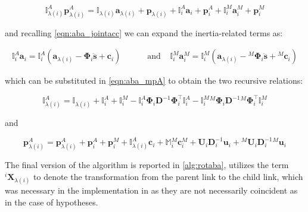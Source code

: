 \begin{equation}
    \label{eqn:aba_mpA}
    \mathbb{I} _{\lambda(i)} ^A \mathbf{p} _{\lambda(i)} ^A = \mathbb{I} _{\lambda (i)} \mathbf{a} _{\lambda (i)} + \mathbf{p} _{\lambda (i)} + \mathbb{I} _i ^A \mathbf{a} _i + \mathbf{p} _i ^A + \mathbb{I} _i ^M \mathbf{a} _i ^M + \mathbf{p} _i ^M
\end{equation}

and recalling \cref{eqn:aba_jointacc} we can expand the inertia-related terms as:

\begin{align}
    \mathbb{I} _i ^A \mathbf{a} _i = \mathbb{I} _i ^A (\mathbf{a} _{\lambda (i)} - \boldsymbol{\Phi} _i \ddot{\mathbf{s}} + \mathbf{c}_i) & \qquad \text{ and } & \mathbb{I} _i ^M \mathbf{a} _i ^M = \mathbb{I} _i ^M (\mathbf{a} _{\lambda (i)} - {} ^M \boldsymbol{\Phi} _i \ddot{\mathbf{s}} + {} ^M \mathbf{c}_i)
\end{align}

which can be substituted in \cref{eqn:aba_mpA} to obtain the two recursive relations:

\begin{equation}
    \mathbb{I} _{\lambda(i)} ^A = \mathbb{I} _{\lambda (i)} + \mathbb{I} _i ^A + \mathbb{I} _i ^M - \mathbb{I} _i ^A \boldsymbol{\Phi} _i \mathbf{D}^{-1} \boldsymbol{\Phi} _i ^\top  \mathbb{I} _i ^A - \mathbb{I} _i ^M {} ^M \boldsymbol{\Phi} _i \mathbf{D}^{-1} {} ^M \boldsymbol{\Phi} _i ^\top  \mathbb{I} _i ^M
\end{equation}

and

\begin{equation}
    \mathbf{p} ^A _{\lambda (i)} = \mathbf{p} ^A _{\lambda (i)} + \mathbf{p} ^A_i + \mathbf{p} ^M_i  + \mathbb{I} ^A _{\lambda (i)}  \mathbf{c}_i + \mathbb{M} {} ^M _i \mathbf{c} ^M _i + {}  \mathbf{U} _i \mathbf{D} ^{-1} _i {} \mathbf{u} _i + {} ^M \mathbf{U} _i \mathbf{D} ^{-1} _i {} ^M\mathbf{u} _i
\end{equation}

The final version of the algorithm is reported in \cref{alg:rotaba}, utilizes the term  ${}^i\mathbf{X} _{\lambda (i)}$ to denote the transformation from the parent link to the child link, which was necessary in the implementation in \jaxsim as they are not necessarily coincident as in the case of \citet{featherstone_rigid_2008} hypotheses.

